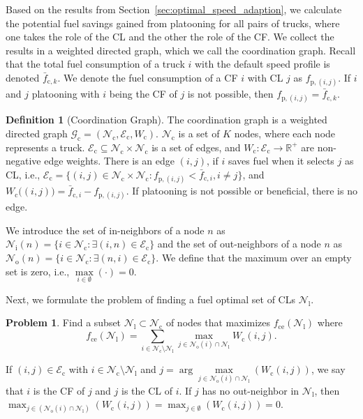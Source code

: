 \documentclass[letterpaper,10pt,conference,twocolumn]{IEEEtran}
\newcommand{\set}[1]{\mathcal{#1}}
\newcommand{\op}[1]{\mathrm{#1}}
\theoremstyle{definition}
\newtheorem{defi}{Definition}
\newtheorem{problem}{Problem}
\begin{document}
Based on the results from Section~\ref{sec:optimal_speed_adaption}, we calculate the potential fuel savings gained from platooning for all pairs of trucks, where one takes the role of the CL and the other the role of the CF. We collect the results in a weighted directed graph, which we call the coordination graph. Recall that the total fuel consumption of a truck $i$ with the default speed profile is denoted $\bar{f}_{\op{c},k}$. We denote the fuel consumption of a CF $i$ with CL $j$ as $f_{\op{p},(i,j)}$. If $i$ and $j$ platooning with $i$ being the CF of $j$ is not possible, then $f_{\op{p},(i,j)} = \bar{f}_{\op{c},k}$.
\begin{defi}[Coordination Graph]
 The coordination graph is a weighted directed graph $\set{G}_\op{c} = (\set{N}_\op{c},\set{E}_\op{c},W_\op{c})$. $\set{N}_\op{c}$ is a set of $K$ nodes, where each node represents a truck. $\set{E}_\op{c} \subseteq \set{N}_\op{c} \times \set{N}_\op{c}$ is a set of edges, and $W_\op{c}: \set{E}_\op{c} \rightarrow \mathbb{R}^+$ are non-negative edge weights. There is an edge $(i,j)$, if $i$ saves fuel when it selects $j$ as CL, i.e., $\set{E}_\op{c} =  \{(i,j) \in \set{N}_\op{c} \times \set{N}_\op{c}: f_{\op{p},(i,j)} < \bar{f}_{\op{c},i}, i \neq j\}$, and $W_\op{c}\big((i,j)\big) = \bar{f}_{\op{c},i} - f_{\op{p},(i,j)}$. If platooning is not possible or beneficial, there is no edge. 
\end{defi}

We introduce the set of in-neighbors of a node $n$ as $\set{N}_{\op{i}}(n) = \{i \in \set{N}_\op{c}: \exists (i,n) \in \set{E}_\op{c}\}$ and the set of out-neighbors of a node $n$ as $\set{N}_{\op{o}}(n) = \{i \in \set{N}_\op{c}: \exists (n,i) \in \set{E}_\op{c}\}$. We define that the maximum over an empty set is zero, i.e., $\max\limits_{i \in \emptyset}(\cdot) = 0$. 

Next, we formulate the problem of finding a fuel optimal set of CLs $\set{N}_\op{l}$.
\begin{problem}\label{prob:clustering}
Find a subset $\set{N}_\op{l} \subset \set{N}_\op{c}$ of nodes that maximizes $f_\op{ce}(\set{N}_\op{l})$ where
\begin{equation}
 f_\op{ce}(\set{N}_\op{l}) = \sum\limits_{i \in \set{N}_\op{c} \setminus \set{N}_\op{l}} \max_{j \in \set{N}_{\op{o}}(i) \cap \set{N}_\op{l}}  W_\op{c}(i,j).  \label{eq:clustering_problem}
\end{equation}
\end{problem}
If $(i,j) \in \set{E}_\op{c}$ with $i \in \set{N}_\op{c} \setminus \set{N}_\op{l}$ and $j = \arg \max\limits_{j \in \set{N}_\op{o}(i) \cap \set{N}_\op{l}}(W_\op{c}(i,j))$, we say that $i$ is the CF of $j$ and $j$ is the CL of $i$. If $j$ has no out-neighbor in $\set{N}_\op{l}$, then $\max_{j \in (\set{N}_{\op{o}}(i) \cap \set{N}_\op{l})} ( W_\op{c}(i,j) ) = \max_{j \in \emptyset} ( W_\op{c}(i,j) ) = 0$. 
\end{document}
